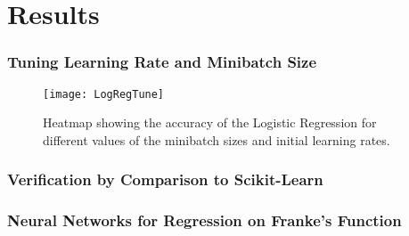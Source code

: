 \section{Results}
\label{sec:results}

\subsubsection{Tuning Learning Rate and Minibatch Size}
\begin{figure}[htbp]
	\centering
	\texttt{[image: LogRegTune]}
	\caption{Heatmap showing the accuracy of the Logistic Regression for different
    values of the minibatch sizes and initial learning rates.}
	\label{fig:TuneLogReg}
\end{figure}




\subsubsection{Verification by Comparison to Scikit-Learn}

\subsubsection{Neural Networks for Regression on Franke's Function}


\begin{figure}[htbp]
	\centering
	\caption{}
	\label{fig:}
\end{figure}
